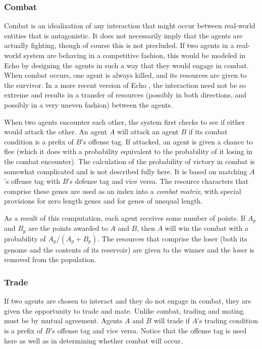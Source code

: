 \subsubsection{Combat}

Combat is an idealization of any interaction that might occur between
real-world entities that is antagonistic. It does not necessarily
imply that the agents are actually fighting, though of course this is
not precluded. If two agents in a real-world system are behaving in a
competitive fashion, this would be modeled in Echo by designing the
agents in such a way that they would engage in combat. When combat
occurs, one agent is always killed, and its resources are given to the
survivor. In a more recent version of Echo \cite{Holland94}, the
interaction need not be so extreme and results in a transfer of
resources (possibly in both directions, and possibly in a very uneven
fashion) between the agents.

When two agents encounter each other, the system first checks to see
if either would attack the other. An agent $A$ will attack an agent
$B$ if its combat condition is a prefix of $B$'s offense tag.  If
attacked, an agent is given a chance to flee (which it does with a
probability equivalent to the probability of it losing in the combat
encounter). The calculation of the probability of victory in combat is
somewhat complicated and is not described fully here. It is based on
matching $A$'s offense tag with $B$'s defense tag and vice versa. The
resource characters that comprise these genes are used as an index
into a {\em combat matrix}, with special provisions for zero length genes
and for genes of unequal length.

As a result of this computation, each agent receives some number of
points. If $A_p$ and $B_p$ are the points awarded to $A$ and $B$, 
then $A$ will win the combat with a probability of $A_p / (A_p + B_p)$.
The resources that comprise the loser (both its genome and the
contents of its reservoir) are given to the winner and the loser is
removed from the population.

\subsubsection{Trade}

If two agents are chosen to interact and they do not engage in combat,
they are given the opportunity to trade and mate. Unlike combat,
trading and mating must be by mutual agreement. Agents $A$ and $B$
will trade if $A$'s trading condition is a prefix of $B$'s offense tag
and vice versa. Notice that the offense tag is used here as well as in
determining whether combat will occur.

